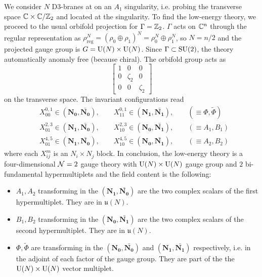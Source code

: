         We consider $N$ D$3$-branes at on an $A_1$ singularity, i.e. probing the transverse space $\mathbb{C}\times\mathbb{C}/\mathbb{Z}_2$ and located at the singularity. To find the low-energy theory, we proceed to the usual orbifold projection for $\Gamma=\mathbb{Z}_2$. $\Gamma$ acts on $\mathbb{C}^n$ through the regular representation as $\rho^N_{\text{reg}}=(\rho_0\oplus\rho_1)^N=\rho^N_0\oplus\rho^N_1$, so $N=n/2$ and the projected gauge group is $G=\text{U}(N)\times\text{U}(N)$. Since $\Gamma\subset\text{SU}(2)$, the theory automatically anomaly free (because chiral). The orbifold group acts as
        \begin{equation}
            \begin{bmatrix}
                1 & 0 & 0 \\
                0 & \zeta_2 & 0 \\
                0 & 0 & \zeta_2
            \end{bmatrix}
        \end{equation}
        on the transverse space. The invariant configurations read
        \begin{align}
            &X^{0,1}_{00}\in(\boldsymbol{N_0},\bar{\boldsymbol{N_0}}),\qquad X^{0,1}_{11}\in(\boldsymbol{N_1},\bar{\boldsymbol{N_1}}),\qquad (\equiv\Phi,\tilde{\Phi})\\
            &X^{2,3}_{01}\in(\boldsymbol{N_1},\bar{\boldsymbol{N_0}}),\qquad X^{2,3}_{10}\in(\boldsymbol{N_0},\bar{\boldsymbol{N_1}}),\qquad (\equiv A_1,B_1)\\
            &X^{4,5}_{01}\in(\boldsymbol{N_1},\bar{\boldsymbol{N_0}}),\qquad X^{4,5}_{10}\in(\boldsymbol{N_0},\bar{\boldsymbol{N_1}}),\qquad (\equiv A_2,B_2)
        \end{align}
        where each $X^m_{ij}$ is an $N_i\times N_j$ block. In conclusion, the low-energy theory is a four-dimensional $\mathcal{N}=2$ gauge theory with $\text{U}(N)\times\text{U}(N)$ gauge group and $2$ bi-fundamental hypermultiplets and the field content is the following:
        \begin{itemize}
            \item $A_1,A_2$ transforming in the $(\boldsymbol{N_1},\bar{\boldsymbol{N_0}})$ are the two complex scalars of the first hypermultiplet. They are in $\mathfrak{u}(N)$.
            \item $B_1,B_2$ transforming in the $(\boldsymbol{N_0},\bar{\boldsymbol{N_1}})$ are the two complex scalars of the second hypermultiplet. They are in $\mathfrak{u}(N)$.
            \item $\Phi,\tilde{\Phi}$ are transforming in the $(\boldsymbol{N_0},\bar{\boldsymbol{N_0}})$ and $(\boldsymbol{N_1},\bar{\boldsymbol{N_1}})$ respectively, i.e. in the adjoint of each factor of the gauge group. They are part of the the $\text{U}(N)\times\text{U}(N)$ vector multiplet.
        \end{itemize}


